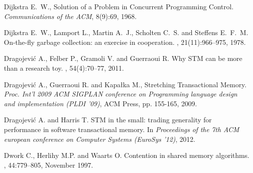 \begin{thebibliography}{99}
{%
Dijkstra E.~W., 
Solution of a Problem in Concurrent Programming Control.
{\it  Communications of the  ACM}, 8(9):69, 1968.

Dijkstra E.~W., Lamport L., Martin A.~J., Scholten C.~S. and 
  Steffens E.~F.~M.
\newblock On-the-fly garbage collection: an exercise in cooperation.
, 21(11):966--975, 1978.




Dragojevi\'{c} A., Felber P., Gramoli V. and Guerraoui R.
\newblock Why {STM} can be more than a research toy.
, 54(4):70--77, 2011.




Dragojevi\'{c} A., Guerraoui R. and  Kapa\l{}ka M., 
Stretching Transactional Memory. 
{\it  Proc. Int'l  2009 ACM SIGPLAN conference on Programming
 language design and implementation (PLDI '09)},  
ACM Press, pp. 155-165,  2009. 


Dragojevi\'{c} A. and Harris T. 
\newblock STM in the small: trading generality for performance in software transactional memory.
\newblock In {\em Proceedings of the 7th ACM european conference on Computer Systems (EuroSys '12)}, 2012.



Dwork C., Herlihy M.P. and Waarts O.
\newblock Contention in shared memory algorithms.
, 44:779--805, November 1997.


}
\end{thebibliography}
